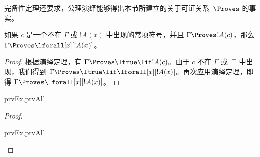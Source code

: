\documentclass[../../../include/open-logic-section]{subfiles}
\begin{document}


\begin{explain}
  完备性定理还要求，公理演绎能够得出本节所建立的关于可证关系~$\Proves$ 的事实。
\end{explain}

\begin{thm}
 如果 $c$ 是一个不在 $\Gamma$ 或 $!A(x)$ 中出现的常项符号，并且 $\Gamma \Proves !A(c)$，那么 $\Gamma
\Proves \lforall[x][!A(x)]$。
\end{thm}

\begin{proof}
根据演绎定理，有 $\Gamma \Proves \ltrue \lif !A(c)$。由于 $c$ 不在 $\Gamma$ 或~$\top$ 中出现，我们得到 $\Gamma \Proves
\ltrue \lif \lforall[x][!A(x)]$。再次应用演绎定理，即得 $\Gamma \Proves
\lforall[x][!A(x)]$。
\end{proof}

\begin{prop}
\begin{tagenumerate}{prvEx,prvAll}

\end{tagenumerate}
\end{prop}

\begin{proof}
\begin{tagenumerate}{prvEx,prvAll}
\end{tagenumerate}
\end{proof}
\end{document}
